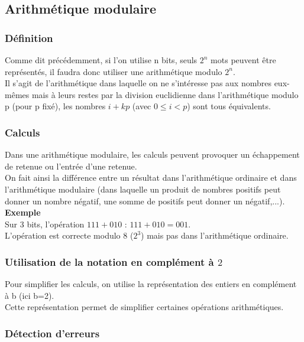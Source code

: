 \documentclass[a4paper,10pt]{book}
\begin{document}
\subsection{Arithmétique modulaire}
\subsubsection{Définition}
Comme dit précédemment, si l'on utilise n bits, seuls $2^{n}$ mots peuvent être représentés, il faudra donc utiliser une arithmétique modulo $2^{n}$.\\

Il s'agit de l’arithmétique dans laquelle on ne s’intéresse pas aux nombres eux-mêmes mais à leurs restes par la division euclidienne dans l’arithmétique modulo p (pour p fixé), les nombres $i+kp$ (avec $0\leq i<p$) sont tous équivalents.\\

\subsubsection{Calculs}
Dans une arithmétique modulaire, les calculs peuvent provoquer un échappement de retenue ou l'entrée d'une retenue.\\

On fait ainsi la différence entre un résultat dans l'arithmétique ordinaire et dans l'arithmétique modulaire (dans laquelle un produit de nombres positifs peut donner un nombre négatif, une somme de positifs peut donner un négatif,...).\\

\textbf{Exemple}\\

Sur 3 bits, l'opération $111+010$ : $111+010=001$.\\
L'opération est correcte modulo 8 ($2^{3}$) mais pas dans l'arithmétique ordinaire.

\subsubsection{Utilisation de la notation en complément à $2$}
Pour simplifier les calculs, on utilise la représentation des entiers en complément à b (ici b=2).\\
Cette représentation permet de simplifier certaines opérations arithmétiques.\\

\subsubsection{Détection d'erreurs}
\end{document}
